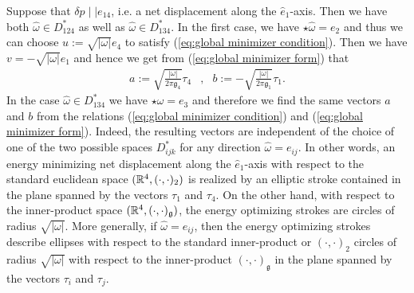 \begin{remark}
Suppose that $\delta p \mid \mid e_{14}$, i.e. a net displacement along the $\hat{e}_1$-axis. Then we have both $\hat{\omega} \in D^{*}_{124}$ as well as $\hat{\omega} \in D_{134}^{*}$. In the first case, we have $\star \hat{\omega} = e_2$ and thus we can choose $u := \sqrt{|\omega|} e_4$ to satisfy (\ref{eq:global minimizer condition}). Then we have $v = -\sqrt{|\omega|} e_1$ and hence we get from (\ref{eq:global minimizer form}) that
\begin{eqnarray}
	a := \sqrt{\frac{|\omega|}{2 \pi \mathfrak{g}_4}} \tau_{4}&, & b := -\sqrt{\frac{|\omega|}{2 \pi \mathfrak{g}_{1}}} \tau_1.
\end{eqnarray}
In the case $\hat{\omega} \in D^{*}_{134}$ we have $\star\hat{\omega} = e_3$ and therefore we find the same vectors $a$ and $b$ from the relations (\ref{eq:global minimizer condition}) and (\ref{eq:global minimizer form}). Indeed, the resulting vectors are independent of the choice of one of the two possible spaces $D^*_{ijk}$ for any direction $\hat{\omega} = e_{ij}$. In other words, an energy minimizing net displacement along the $\hat{e}_1$-axis with respect to the standard euclidean space $(\mathbb{R}^4, (\cdot, \cdot)_2)$ is realized by an elliptic stroke contained in the plane spanned by the vectors $\tau_1$ and $\tau_4$. On the other hand, with respect to the inner-product space $(\mathbb{R}^4, (\cdot, \cdot)_{\mathfrak{g}})$, the energy optimizing strokes are circles of radius $\sqrt{|\omega|}$. More generally, if $\hat{\omega} = e_{ij}$, then the energy optimizing strokes describe ellipses with respect to the standard inner-product or $(\cdot, \cdot)_2$ circles of radius $\sqrt{|\omega|}$ with respect to the inner-product $(\cdot, \cdot)_{\mathfrak{g}}$ in the plane spanned by the vectors $\tau_i$ and $\tau_j$.
\end{remark}

